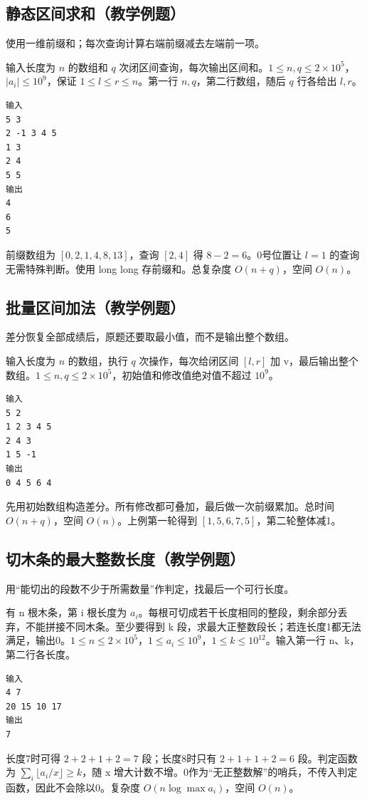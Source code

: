 \subsection{静态区间求和（教学例题）}

使用一维前缀和；每次查询计算右端前缀减去左端前一项。

输入长度为 $n$ 的数组和 $q$ 次闭区间查询，每次输出区间和。$1\le n,q\le2\times10^5$，$|a_i|\le10^9$，保证 $1\le l\le r\le n$。第一行 $n,q$，第二行数组，随后 $q$ 行各给出 $l,r$。
\begin{verbatim}
输入
5 3
2 -1 3 4 5
1 3
2 4
5 5
输出
4
6
5
\end{verbatim}
前缀数组为 $[0,2,1,4,8,13]$，查询 $[2,4]$ 得 $8-2=6$。0号位置让 $l=1$ 的查询无需特殊判断。使用 long long 存前缀和。总复杂度 $O(n+q)$，空间 $O(n)$。
\subsection{批量区间加法（教学例题）}

差分恢复全部成绩后，原题还要取最小值，而不是输出整个数组。

输入长度为 $n$ 的数组，执行 $q$ 次操作，每次给闭区间 $[l,r]$ 加 v，最后输出整个数组。$1\le n,q\le2\times10^5$，初始值和修改值绝对值不超过 $10^9$。
\begin{verbatim}
输入
5 2
1 2 3 4 5
2 4 3
1 5 -1
输出
0 4 5 6 4
\end{verbatim}
先用初始数组构造差分。所有修改都可叠加，最后做一次前缀累加。总时间 $O(n+q)$，空间 $O(n)$。上例第一轮得到 $[1,5,6,7,5]$，第二轮整体减1。
\subsection{切木条的最大整数长度（教学例题）}

用“能切出的段数不少于所需数量”作判定，找最后一个可行长度。

有 n 根木条，第 i 根长度为 $a_i$。每根可切成若干长度相同的整段，剩余部分丢弃，不能拼接不同木条。至少要得到 k 段，求最大正整数段长；若连长度1都无法满足，输出0。$1\le n\le2\times10^5$，$1\le a_i\le10^9$，$1\le k\le10^{12}$。输入第一行 n、k，第二行各长度。
\begin{verbatim}
输入
4 7
20 15 10 17
输出
7
\end{verbatim}
长度7时可得 $2+2+1+2=7$ 段；长度8时只有 $2+1+1+2=6$ 段。判定函数为 $\sum_i\lfloor a_i/x\rfloor\ge k$，随 x 增大计数不增。0作为“无正整数解”的哨兵，不传入判定函数，因此不会除以0。复杂度 $O(n\log\max a_i)$，空间 $O(n)$。
